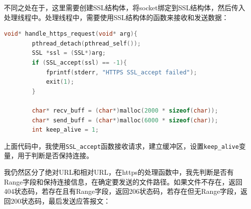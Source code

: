 \documentclass[UTF8]{article}
\begin{document}
不同之处在于，这里需要创建SSL结构体，将socket绑定到SSL结构体，然后传入处理线程中。处理线程中，需要使用SSL结构体的函数来接收和发送数据：

\begin{lstlisting}[language=c]
    void* handle_https_request(void* arg){
        pthread_detach(pthread_self());
        SSL *ssl = (SSL*)arg;
        if (SSL_accept(ssl) == -1){
            fprintf(stderr, "HTTPS SSL_accept failed");
            exit(1);
        }
    
        char* recv_buff = (char*)malloc(2000 * sizeof(char));
        char* send_buff = (char*)malloc(6000 * sizeof(char));
        int keep_alive = 1;
\end{lstlisting}

上面代码中，我使用\texttt{SSL\_accept}函数接收请求，建立缓冲区，设置\texttt{keep\_alive}变量，用于判断是否保持连接。

我仍然区分了绝对URL和相对URL，在https的处理函数中，我先判断是否有Range字段和保持连接信息，在确定要发送的文件路径。如果文件不存在，返回404状态码，若存在且有Range字段，返回206状态码，若存在但无Range字段，返回200状态码，最后发送应答报文：
\end{document}
